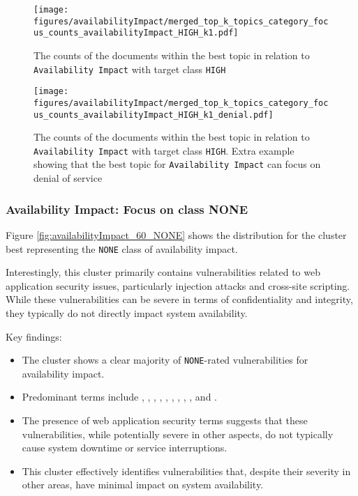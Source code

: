 \begin{figure}[t]
	\begin{center}
		\texttt{[image: figures/availabilityImpact/merged\_top\_k\_topics\_category\_focus\_counts\_availabilityImpact\_HIGH\_k1.pdf]}
	\end{center}
	\caption{The counts of the documents within the best topic in relation to \texttt{Availability Impact} with target class \texttt{HIGH}}
	\label{fig:availabilityImpact_60_HIGH}
\end{figure}

\begin{figure}[t]
	\begin{center}
		\texttt{[image: figures/availabilityImpact/merged\_top\_k\_topics\_category\_focus\_counts\_availabilityImpact\_HIGH\_k1\_denial.pdf]}
	\end{center}
	\caption{The counts of the documents within the best topic in relation to \texttt{Availability Impact} with target class \texttt{HIGH}. Extra example showing that the best topic for \texttt{Availability Impact} can focus on denial of service}
	\label{fig:availabilityImpact_60_HIGH_denial}
\end{figure}

\subsubsection{Availability Impact: Focus on class NONE}

Figure \ref{fig:availabilityImpact_60_NONE} shows the distribution for the cluster best representing the \texttt{NONE} class of availability impact.

Interestingly, this cluster primarily contains vulnerabilities related to web application security issues, particularly injection attacks and cross-site scripting. While these vulnerabilities can be severe in terms of confidentiality and integrity, they typically do not directly impact system availability.

Key findings:

\begin{itemize}

	\item The cluster shows a clear majority of \texttt{NONE}-rated vulnerabilities for availability impact.
	\item Predominant terms include , , , , , , , , , and .
	\item The presence of web application security terms suggests that these vulnerabilities, while potentially severe in other aspects, do not typically cause system downtime or service interruptions.
	\item This cluster effectively identifies vulnerabilities that, despite their severity in other areas, have minimal impact on system availability.
\end{itemize}

